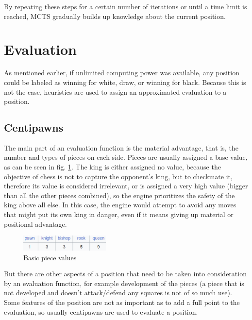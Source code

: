 By repeating these steps for a certain number of iterations or until a time limit is reached, MCTS gradually builds up knowledge about the current position.

\section{Evaluation}
\label{sec:ch2sec3}

As mentioned earlier, if unlimited computing power was available, any position could be labeled as winning for white, draw, or winning for black. Because this is not the case, heuristics are used to assign an approximated evaluation to a position.

\subsection{Centipawns}
\label{subsec:ch2sec3subsec1}

The main part of an evaluation function is the material advantage, that is, the number and types of pieces on each side. Pieces are usually assigned a base value, as can be seen in fig. \ref{fig:basicPieceValues}. The king is either assigned no value, because the objective of chess is not to capture the opponent's king, but to checkmate it, therefore its value is considered irrelevant, or is assigned a very high value (bigger than all the other pieces combined), so the engine prioritizes the safety of the king above all else. In this case, the engine would attempt to avoid any moves that might put its own king in danger, even if it means giving up material or positional advantage.

\begin{figure}[h]
    \centering
    \includegraphics[width=0.4\textwidth]{figures/piece-basic-values.png}
    \caption{Basic piece values \cite{chess-piece-values}}
    \label{fig:basicPieceValues}
\end{figure}

But there are other aspects of a position that need to be taken into consideration by an evaluation function, for example development of the pieces (a piece that is not developed and doesn't attack/defend any squares is not of so much use). Some features of the position are not as important as to add a full point to the evaluation, so usually centipawns are used to evaluate a position. 

